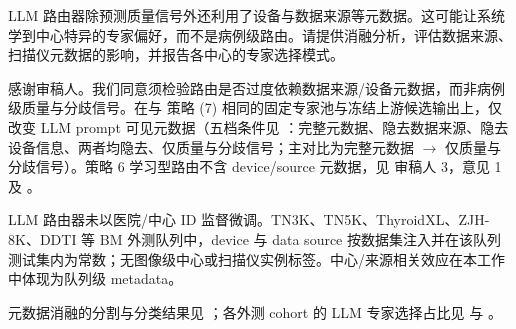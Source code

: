 \begin{reviewercomment}
LLM 路由器除预测质量信号外还利用了设备与数据来源等元数据。这可能让系统学到中心特异的专家偏好，而不是病例级路由。请提供消融分析，评估数据来源、扫描仪元数据的影响，并报告各中心的专家选择模式。
\end{reviewercomment}
\begin{authorresponse}
感谢审稿人。我们同意须检验路由是否过度依赖数据来源/设备元数据，而非病例级质量与分歧信号。在与  策略 (7) 相同的固定专家池与冻结上游候选输出上，仅改变 LLM prompt 可见元数据（五档条件见 ：完整元数据、隐去数据来源、隐去设备信息、两者均隐去、仅质量与分歧信号；主对比为完整元数据 $\rightarrow$ 仅质量与分歧信号）。策略 6 学习型路由不含 device/source 元数据，见 审稿人 3，意见 1 及 。\par
LLM 路由器未以医院/中心 ID 监督微调。TN3K、TN5K、ThyroidXL、ZJH-8K、DDTI 等 BM 外测队列中，device 与 data source 按数据集注入并在该队列测试集内为常数；无图像级中心或扫描仪实例标签。中心/来源相关效应在本工作中体现为队列级 metadata。\par
元数据消融的分割与分类结果见 ；各外测 cohort 的 LLM 专家选择占比见  与 。\par
\par
\end{authorresponse}



